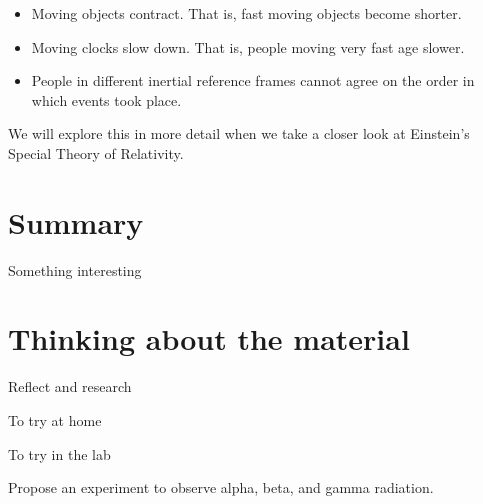 \begin{itemize}
\item Moving objects contract. That is, fast moving objects become shorter.
\item Moving clocks slow down. That is, people moving very fast age slower.
\item People in different inertial reference frames cannot agree on the order in which events took place. 
\end{itemize}
We will explore this in more detail when we take a closer look at Einstein's Special Theory of Relativity.

\newpage
\section{Summary}
\vspace{2cm}
\begin{chapterSummary}
\item Something interesting
\end{chapterSummary}


\newpage
\section{Thinking about the material}

\begin{chapteractivity}{Reflect and research}
	{
		\item 
	}
\end{chapteractivity}

\begin{chapteractivity}{To try at home}
	{
		\item 
	}
\end{chapteractivity}

\begin{chapteractivity}{To try in the lab}
	{
		\item Propose an experiment to observe alpha, beta, and gamma radiation.
	}
\end{chapteractivity}